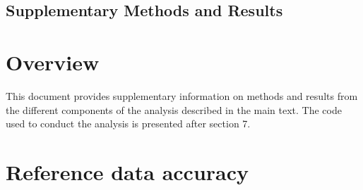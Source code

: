 \documentclass[11pt, titlepage]{article}
\begin{document}
%

\setpagewiselinenumbers
\begin{center}\section*{\Large Supplementary Methods and Results}\end{center}
\section{\large Overview}
This document provides supplementary information on methods and results from the different components of the analysis described in the main text.  The code used to conduct the analysis is presented after section 7.  

\section{\large Reference data accuracy}
\end{document}
